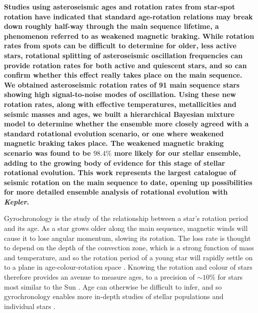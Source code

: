 \documentclass[12pt]{article}
\begin{document}
\textbf{Studies using asteroseismic ages and rotation rates from star-spot rotation have indicated that standard age-rotation relations may break down roughly half-way through the main sequence lifetime, a phenomenon referred to as weakened magnetic braking. While rotation rates from spots can be difficult to determine for older, less active stars, rotational splitting of asteroseismic oscillation frequencies can provide rotation rates for both active and quiescent stars, and so can confirm whether this effect really takes place on the main sequence.\\
We obtained asteroseismic rotation rates of 91 main sequence stars showing high signal-to-noise modes of oscillation.
Using these new rotation rates, along with effective temperatures, metallicities and seismic masses and ages, we built a hierarchical Bayesian mixture model to determine whether the ensemble more closely agreed with a standard rotational evolution scenario, or one where weakened magnetic braking takes place. The weakened magnetic braking scenario was found to be $98.4\%$ more likely for our stellar ensemble, adding to the growing body of evidence for this stage of stellar rotational evolution. This work represents the largest catalogue of seismic rotation on the main sequence to date, opening up possibilities for more detailed ensemble analysis of rotational evolution with \textit{Kepler}.}

Gyrochronology is the study of the relationship between a star's rotation period and its age. As a star grows older along the main sequence, magnetic winds will cause it to lose angular momentum, slowing its rotation. The loss rate is thought to depend on the depth of the convection zone, which is a strong function of mass and temperature, and so the rotation period of a young star will rapidly settle on to a plane in age-colour-rotation space \cite{barnes2007}. Knowing the rotation and colour of stars therefore provides an avenue to measure ages, to a precision of $\sim 10\%$ for stars most similar to the Sun \cite{meibom+2015}. Age can otherwise be difficult to infer, and so gyrochronology enables more in-depth studies of stellar populations and individual stars \cite{leiner+2019,claytor+2019}.
\end{document}
